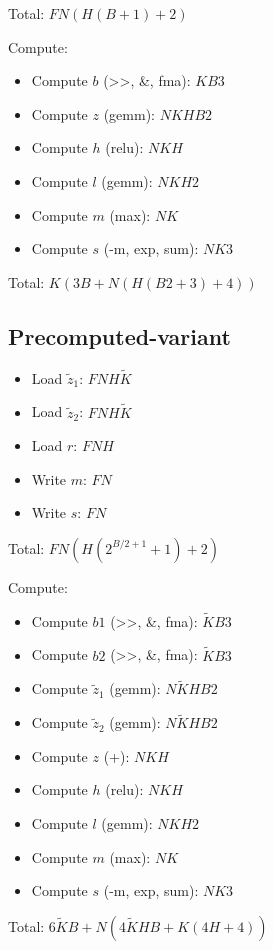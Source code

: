 \documentclass{article}
\begin{document}
Total: $FN(H(B+1)+2)$

Compute:
\begin{itemize}
    \item Compute $b$ (>>, \&, fma): $KB3$
    \item Compute $z$ (gemm): $NKHB2$
    \item Compute $h$ (relu): $NKH$
    \item Compute $l$ (gemm): $NKH2$
    \item Compute $m$ (max): $NK$
    \item Compute $s$ (-m, exp, sum): $NK3$
\end{itemize}

Total: $K(3B+N(H(B2+3)+4))$

\subsection{Precomputed-variant}
\begin{itemize}
    \item Load $\tilde{z}_1$: $FNH\tilde{K}$
    \item Load $\tilde{z}_2$: $FNH\tilde{K}$
    \item Load $r$: $FNH$
    \item Write $m$: $FN$
    \item Write $s$: $FN$
\end{itemize}

Total: $FN(H(2^{B/2+1}+1)+2)$

Compute:
\begin{itemize}
    \item Compute $b1$ (>>, \&, fma): $\tilde{K}B3$
    \item Compute $b2$ (>>, \&, fma): $\tilde{K}B3$
    \item Compute $\tilde{z}_1$ (gemm): $N\tilde{K}HB2$
    \item Compute $\tilde{z}_2$ (gemm): $N\tilde{K}HB2$
    \item Compute $z$ (+): $NKH$
    \item Compute $h$ (relu): $NKH$
    \item Compute $l$ (gemm): $NKH2$
    \item Compute $m$ (max): $NK$
    \item Compute $s$ (-m, exp, sum): $NK3$
\end{itemize}

Total: $6\tilde{K}B+N(4\tilde{K}HB+K(4H+4))$
\end{document}
